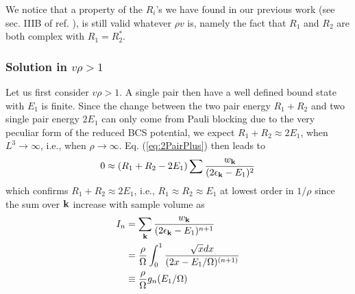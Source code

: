 \documentclass[aps,prb,showpacs,reprint]{revtex4-1}
\begin{document}
We notice that a property of the $R_i$'s we have found in our previous work (see sec. IIIB of ref. \cite{combescotBCS}), is still valid whatever $\rho{}v$ is, namely the fact that $R_1$ and $R_2$ are both complex with $R_1=R_2^*$.%


\subsubsection{Solution in $v\rho>1$}
Let us first consider  $v\rho>1$.  A single pair then have a well defined bound state with $E_1$ is finite. Since the change between the two pair energy $R_{1}+R_{2}$ and two single pair energy $2E_{1}$ can only come from Pauli blocking due to the very peculiar form of the reduced BCS potential, we expect $R_1+R_2\approx2E_1$, when $L^3\rightarrow\infty$, i.e., when $\rho\rightarrow\infty$. Eq. (\ref{eq:2PairPlus}) then leads to  
\begin{equation*}
0\approx(R_1+R_2-2E_1)\sum\frac{w_{\mathbf{k}}}{(2\epsilon_{\mathbf{k}}-E_1)^2}
\label{eq:}
\end{equation*}
which confirms  $R_1+R_2\approx2E_1$, i.e.,  $R_1\approx{}R_2\approx{}E_1$ at lowest order in $1/\rho$ since the sum over $\mathbf{k}$ increase with sample volume as   
\begin{equation}
\begin{split}
I_n&=\sum_{\mathbf{k}}\frac{w_{\mathbf{k}}}{(2\epsilon_{\mathbf{k}}-E_1)^{n+1}}\\
	&=\frac{\rho}{\Omega}\int^1_0\frac{\sqrt{x}dx}{(2x-E_1/\Omega)^{(n+1)}}\\
	&\equiv\frac{\rho}{\Omega}g_n(E_1/\Omega)
\end{split}
\label{eq:}
\end{equation}
\end{document}
